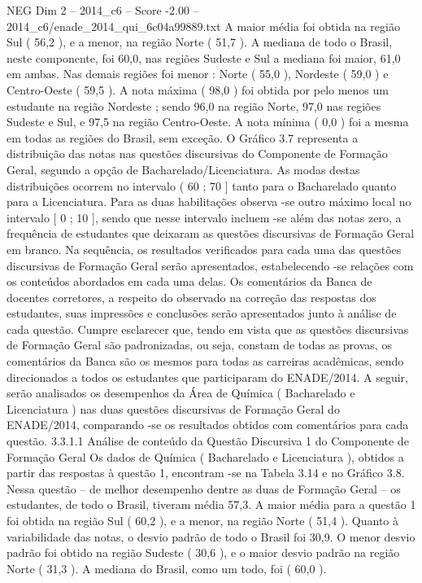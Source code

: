 \begin{textsample}{NEG Dim 2 – 2014\_c6 – Score -2.00 – 2014\_c6/enade\_2014\_qui\_6c04a99889.txt}
A maior média foi obtida na região Sul ( 56,2 ), e a menor, na região Norte ( 51,7 ).
A mediana de todo o Brasil, neste componente, foi 60,0, nas regiões Sudeste e Sul a mediana foi maior, 61,0 em ambas.
Nas demais regiões foi menor : Norte ( 55,0 ), Nordeste ( 59,0 ) e Centro-Oeste ( 59,5 ).
A nota máxima ( 98,0 ) foi obtida por pelo menos um estudante na região Nordeste ; sendo 96,0 na região Norte, 97,0 nas regiões Sudeste e Sul, e 97,5 na região Centro-Oeste.
A nota mínima ( 0,0 ) foi a mesma em todas as regiões do Brasil, sem exceção.
O Gráfico 3.7 representa a distribuição das notas nas questões discursivas do Componente de Formação Geral, segundo a opção de Bacharelado/Licenciatura.
As modas destas distribuições ocorrem no intervalo ( 60 ; 70 ] tanto para o Bacharelado quanto para a Licenciatura.
Para as duas habilitações observa -se outro máximo local no intervalo [ 0 ; 10 ], sendo que nesse intervalo incluem -se além das notas zero, a frequência de estudantes que deixaram as questões discursivas de Formação Geral em branco.
Na sequência, os resultados verificados para cada uma das questões discursivas de Formação Geral serão apresentados, estabelecendo -se relações com os conteúdos abordados em cada uma delas.
Os comentários da Banca de docentes corretores, a respeito do observado na correção das respostas dos estudantes, suas impressões e conclusões serão apresentados junto à análise de cada questão.
Cumpre esclarecer que, tendo em vista que as questões discursivas de Formação Geral são padronizadas, ou seja, constam de todas as provas, os comentários da Banca são os mesmos para todas as carreiras acadêmicas, sendo direcionados a todos os estudantes que participaram do ENADE/2014.
A seguir, serão analisados os desempenhos da Área de Química ( Bacharelado e Licenciatura ) nas duas questões discursivas de Formação Geral do ENADE/2014, comparando -se os resultados obtidos com comentários para cada questão. 3.3.1.1 Análise de conteúdo da Questão Discursiva 1 do Componente de Formação Geral Os dados de Química ( Bacharelado e Licenciatura ), obtidos a partir das respostas à questão 1, encontram -se na Tabela 3.14 e no Gráfico 3.8.
Nessa questão – de melhor desempenho dentre as duas de Formação Geral – os estudantes, de todo o Brasil, tiveram média 57,3.
A maior média para a questão 1 foi obtida na região Sul ( 60,2 ), e a menor, na região Norte ( 51,4 ).
Quanto à variabilidade das notas, o desvio padrão de todo o Brasil foi 30,9.
O menor desvio padrão foi obtido na região Sudeste ( 30,6 ), e o maior desvio padrão na região Norte ( 31,3 ).
A mediana do Brasil, como um todo, foi ( 60,0 ).

\end{textsample}
